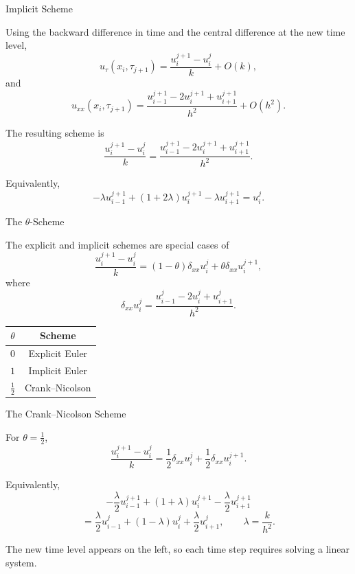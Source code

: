 \documentclass{beamer}
\begin{document}
\begin{frame}{Implicit Scheme}

Using the backward difference in time and the central difference
at the new time level,
\[
u_\tau(x_i,\tau_{j+1})
=
\frac{u_i^{j+1}-u_i^j}{k}
+
O(k),
\]
and
\[
u_{xx}(x_i,\tau_{j+1})
=
\frac{
u_{i-1}^{j+1}-2u_i^{j+1}+u_{i+1}^{j+1}
}{h^2}
+
O(h^2).
\]

The resulting scheme is
\[
\frac{u_i^{j+1}-u_i^j}{k}
=
\frac{
u_{i-1}^{j+1}-2u_i^{j+1}+u_{i+1}^{j+1}
}{h^2}.
\]

Equivalently,
\[
-\lambda u_{i-1}^{j+1}
+
(1+2\lambda)u_i^{j+1}
-\lambda u_{i+1}^{j+1}
=
u_i^j.
\]

\end{frame}


\begin{frame}{The \(\theta\)-Scheme}

The explicit and implicit schemes are special cases of
\[
\frac{u_i^{j+1}-u_i^j}{k}
=
(1-\theta)\delta_{xx}u_i^j
+
\theta\delta_{xx}u_i^{j+1},
\]
where
\[
\delta_{xx}u_i^j
=
\frac{
u_{i-1}^j-2u_i^j+u_{i+1}^j
}{h^2}.
\]

\begin{center}
\begin{tabular}{c|c}
\(\theta\) & Scheme \\ \hline
\(0\) & Explicit Euler \\
\(1\) & Implicit Euler \\
\(\frac12\) & Crank--Nicolson
\end{tabular}
\end{center}

\end{frame}


\begin{frame}{The Crank--Nicolson Scheme}

For \(\theta=\frac12\),
\[
\frac{u_i^{j+1}-u_i^j}{k}
=
\frac12\delta_{xx}u_i^j
+
\frac12\delta_{xx}u_i^{j+1}.
\]

Equivalently,
\[
-\frac{\lambda}{2}u_{i-1}^{j+1}
+
(1+\lambda)u_i^{j+1}
-\frac{\lambda}{2}u_{i+1}^{j+1}
\]
\[
=
\frac{\lambda}{2}u_{i-1}^{j}
+
(1-\lambda)u_i^{j}
+
\frac{\lambda}{2}u_{i+1}^{j},
\qquad
\lambda=\frac{k}{h^2}.
\]

The new time level appears on the left, so each time step
requires solving a linear system.

\end{frame}
\end{document}
